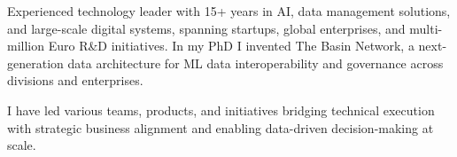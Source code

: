 


\begin{cvparagraph}




%
%
%


Experienced technology leader with 15+ years in AI, data management solutions, and large-scale digital systems, spanning startups, global enterprises, and multi-million Euro R\&D initiatives. In my PhD I invented The Basin Network, a next-generation data architecture for ML data interoperability and governance across divisions and enterprises. 

I have led various teams, products, and initiatives bridging technical execution with strategic business alignment and enabling data-driven decision-making at scale.





\end{cvparagraph}

